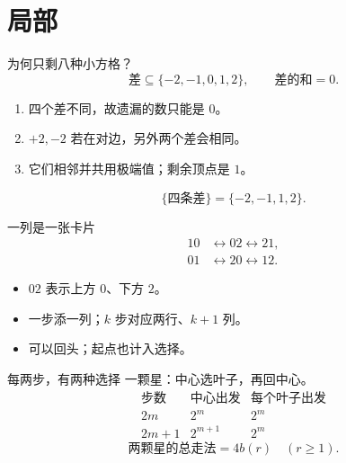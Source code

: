 \documentclass{beamer}
\begin{document}
\section{局部}
\begin{frame}{为何只剩八种小方格？}
\[
\text{差}\subseteq\{-2,-1,0,1,2\},\qquad\text{差的和}=0.
\]
\begin{enumerate}
\item 四个差不同，故遗漏的数只能是 $0$。
\item $+2,-2$ 若在对边，另外两个差会相同。
\item 它们相邻并共用极端值；剩余顶点是 $1$。
\end{enumerate}
\[
\{\text{四条差}\}=\{-2,-1,1,2\}.
\]
\end{frame}
\begin{frame}{一列是一张卡片}
\[
\begin{aligned}
10&\longleftrightarrow02\longleftrightarrow21,\\[5pt]
01&\longleftrightarrow20\longleftrightarrow12.
\end{aligned}
\]
\begin{itemize}
\item $02$ 表示上方 $0$、下方 $2$。
\item 一步添一列；$k$ 步对应两行、$k+1$ 列。
\item 可以回头；起点也计入选择。
\end{itemize}
\end{frame}
\begin{frame}{每两步，有两种选择}
一颗星：中心选叶子，再回中心。
\[
\begin{array}{c|c|c}
\text{步数}&\text{中心出发}&\text{每个叶子出发}\\\hline
2m&2^m&2^m\\
2m+1&2^{m+1}&2^m
\end{array}
\]
\[
\text{两颗星的总走法}=4b(r)\quad(r\geq1).
\]
\end{frame}
\end{document}
